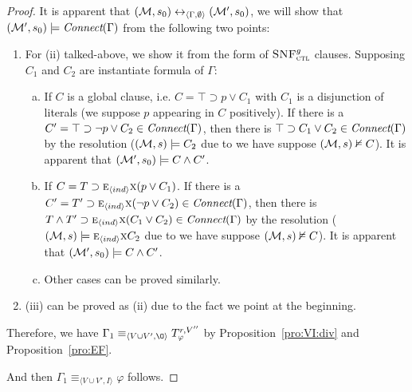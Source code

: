 \documentclass[runningheads]{llncs}
\newcommand{\tuple}[1]{{\langle{#1}\rangle}}
\newcommand{\lrto}{\leftrightarrow}
\newcommand{\Hm} {{\cal M}}
\newcommand{\EXIST}{\textsc{e}}
\newcommand{\NEXT}{\textsc{x}}
\newcommand{\CTLsnf}{{\textsc{SNF}_{\textsc{ctl}}^g}}
\begin{document}
\begin{proof}
It is apparent that $(\Hm, s_0) \lrto_{\tuple{\Gamma, \emptyset}} (\Hm', s_0)$, we will show that $(\Hm', s_0) \models \emph{Connect}(\Gamma)$ from the following two points:
\begin{enumerate}[(1)]
  \item For (ii) talked-above, we show it from the form of $\CTLsnf$ clauses. Supposing $C_1$ and $C_2$ are instantiate formula of $\Gamma$:
  \begin{enumerate}[(a)]
    \item If $C$ is a global clause, i.e. $C=\top \supset p \vee C_1$ with $C_1$ is a disjunction of literals (we suppose $p$ appearing in $C$ positively). If there is a $C'=\top \supset \neg p \vee C_2 \in \emph{Connect}(\Gamma)$, then there is $\top \supset C_1 \vee C_2 \in \emph{Connect}(\Gamma)$ by the resolution ($(\Hm,s) \models C_2$ due to we have suppose $(\Hm,s) \nvDash C$). It is apparent that $(\Hm', s_0) \models C \wedge C'$.
    \item If $C = T \supset \EXIST_{\tuple{ind}}\NEXT (p \vee C_1)$.
        If there is a $C'=T' \supset \EXIST_{\tuple{ind}}\NEXT( \neg p \vee C_2) \in \emph{Connect}(\Gamma)$, then there is $T\wedge T' \supset \EXIST_{\tuple{ind}}\NEXT(C_1 \vee C_2) \in \emph{Connect}(\Gamma)$  by the resolution ($(\Hm,s) \models \EXIST_{\tuple{ind}}\NEXT C_2$ due to we have suppose $(\Hm,s) \nvDash C$). It is apparent that $(\Hm', s_0) \models C \wedge C'$.
    \item Other cases can be proved similarly.
  \end{enumerate}

  \item (iii) can be proved as (ii) due to the fact we point at the beginning.
\end{enumerate}
Therefore, we have $\Gamma_1\equiv_{\tuple{V\cup V', {\O}}} T_{\varphi}^{r, V''}$  by Proposition~\ref{pro:VI:div} and Proposition~\ref{pro:EF}.

And then $\Gamma_1 \equiv_{\tuple{V \cup V', I}} \varphi$ follows.
\end{proof}
\end{document}
